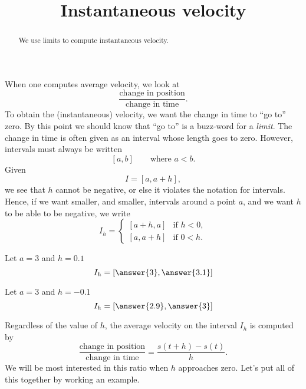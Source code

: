 \documentclass{ximera}
\title[Dig-In:]{Instantaneous velocity}
\begin{document}
\begin{abstract}
We use limits to compute instantaneous velocity.
\end{abstract}
\maketitle

When one computes average velocity, we look at 
\[
\frac{\text{change in position}}{\text{change in time}}.
\]
To obtain the (instantaneous) velocity, we want the change in time to
``go to'' zero. By this point we should know that ``go to'' is a
buzz-word for a \textit{limit}. The change in time is often given as
an interval whose length goes to zero.  However, intervals must always
be written
\[
[a,b] \qquad\text{where $a < b$.}
\]
Given
\[
I = [a, a+h],
\]
we see that $h$ cannot be negative, or else it violates the notation
for intervals. Hence, if we want smaller, and smaller, intervals
around a point $a$, and we want $h$ to be able to be negative, we
write
\[
I_h = 
\begin{cases}
  [a+h,a]  & \text{if $h<0$}, \\ %
  [a,a+h]  & \text{if $0<h$}.     %
\end{cases}
\]
\begin{question}
  Let $a = 3$ and $h = 0.1$
  \[
  I_h = \left[\answer{3},\answer{3.1} \right]
  \]
  \begin{question}
    Let $a = 3$ and $h = -0.1$
  \[
  I_h = \left[\answer{2.9},\answer{3} \right]
  \]
  \end{question}
\end{question}

Regardless of the value of $h$, the average velocity on the interval
$I_h$ is computed by
\[
\frac{\text{change in position}}{\text{change in time}} =
\frac{s(t+h)-s(t)}{h}.
\]
We will be most interested in this ratio when $h$ approaches zero.
Let's put all of this together by working an example.
\end{document}
